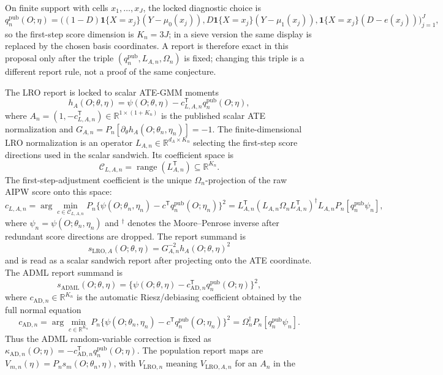 \documentclass[11pt]{article}
\newcommand{\one}{\mathbf{1}}
\newcommand{\transpose}{\mathsf{T}}
\newcommand{\R}{\mathbb{R}}
\theoremstyle{definition}
\theoremstyle{plain}
\theoremstyle{remark}
\begin{document}
On finite support with cells \(x_1,\ldots,x_J\), the locked diagnostic choice is
\[
q^{\mathrm{pub}}_n(O;\eta)=
\bigl((1-D)\one\{X=x_j\}(Y-\mu_0(x_j)),
D\one\{X=x_j\}(Y-\mu_1(x_j)),
\one\{X=x_j\}(D-e(x_j))\bigr)_{j=1}^J,
\]
so the first-step score dimension is \(K_n=3J\); in a sieve version the same display is replaced by the chosen
basis coordinates.  A report is therefore exact in this proposal only after
the triple
\((q^{\mathrm{pub}}_n,L_{A,n},\Omega_n)\) is fixed; changing this triple is a
different report rule, not a proof of the same conjecture.

The LRO report is locked to scalar ATE-GMM moments
\[
h_A(O;\theta,\eta)=
\psi(O;\theta,\eta)-c_{L,A,n}^{\transpose}q^{\mathrm{pub}}_n(O;\eta),
\]
where \(A_n=(1,-c_{L,A,n}^{\transpose})\in\R^{1\times(1+K_n)}\) is the
published scalar ATE normalization and \(G_{A,n}=P_n[\partial_\theta
h_A(O;\theta_n,\eta_n)]=-1\).  The finite-dimensional LRO normalization is an
operator \(L_{A,n}\in\R^{d_A\times K_n}\) selecting the first-step score
directions used in the scalar sandwich.  Its coefficient space is
\[
\mathcal C_{L,A,n}=\operatorname{range}(L_{A,n}^{\transpose})\subseteq\R^{K_n}.
\]
The first-step-adjustment coefficient is the unique \(\Omega_n\)-projection of
the raw AIPW score onto this space:
\[
c_{L,A,n}
=\arg\min_{c\in\mathcal C_{L,A,n}}P_n\{\psi(O;\theta_n,\eta_n)-
c^{\transpose}q^{\mathrm{pub}}_n(O;\eta_n)\}^2
=L_{A,n}^{\transpose}(L_{A,n}\Omega_nL_{A,n}^{\transpose})^\dagger
L_{A,n}P_n[q^{\mathrm{pub}}_n\psi_n],
\]
where \(\psi_n=\psi(O;\theta_n,\eta_n)\) and \({}^\dagger\) denotes the
Moore--Penrose inverse after redundant score directions are dropped.  The report
summand is
\[
s_{\mathrm{LRO},A}(O;\theta,\eta)
  =G_{A,n}^{-2}h_A(O;\theta,\eta)^2
\]
and is read as a scalar sandwich report after projecting onto the ATE coordinate.
The ADML report summand is
\[
s_{\mathrm{ADML}}(O;\theta,\eta)
  =\{\psi(O;\theta,\eta)-c_{\mathrm{AD},n}^{\transpose}
       q^{\mathrm{pub}}_n(O;\eta)\}^2,
\]
where \(c_{\mathrm{AD},n}\in\R^{K_n}\) is the automatic Riesz/debiasing
coefficient obtained by the full normal equation
\[
c_{\mathrm{AD},n}
=\arg\min_{c\in\R^{K_n}}P_n\{\psi(O;\theta_n,\eta_n)-
c^{\transpose}q^{\mathrm{pub}}_n(O;\eta_n)\}^2
=\Omega_n^\dagger P_n[q^{\mathrm{pub}}_n\psi_n].
\]
Thus the ADML random-variable correction is fixed as
\(\kappa_{\mathrm{AD},n}(O;\eta)=-c_{\mathrm{AD},n}^{\transpose}
q^{\mathrm{pub}}_n(O;\eta)\).  The
population report maps are \(V_{m,n}(\eta)=P_n s_{m}(O;\theta_n,\eta)\), with
\(V_{\mathrm{LRO},n}\) meaning \(V_{\mathrm{LRO},A,n}\) for an \(A_n\) in the
\end{document}
